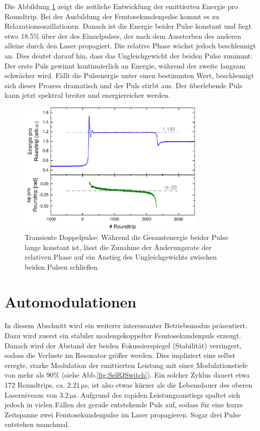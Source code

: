 \documentclass[bachelor,       %
               twoside,        %
               BCOR10mm,       %
               liststotoc,nomtotoc,bibtotoc, %
               english,ngerman, %
               final,          %
               ]{GAUBM}
\begin{document}
Die Abbildung \ref{fig:TransientSplittingAusw} zeigt die zeitliche Entwicklung der emittierten Energie pro Roundtrip.
Bei der Ausbildung der Femtosekundenpulse kommt es zu Relaxationsoszillationen.
Danach ist die Energie beider Pulse konstant und liegt etwa 18.5\% über der des Einzelpulses, der nach dem Aussterben des anderen alleine durch den Laser propagiert.
Die relative Phase wächst jedoch beschleunigt an.
Dies deutet darauf hin, dass das Ungleichgewicht der beiden Pulse zunimmt: Der erste Puls gewinnt kontinuierlich an Energie, während der zweite langsam schwächer wird.
Fällt die Pulsenergie unter einen bestimmten Wert, beschleunigt sich dieser Prozess dramatisch und der Puls stirbt aus.
Der überlebende Puls kann jetzt spektral breiter und energiereicher werden.
\begin{figure}[!htb]
	\centering
	\includegraphics[width=0.8\textwidth]{figures/TransientSplittingAusw}
	\caption{Transiente Doppelpulse: Während die Gesamtenergie beider Pulse lange konstant ist, lässt die Zunahme der Änderungsrate der relativen Phase auf ein Anstieg des Ungleichgewichts zwischen beiden Pulsen schließen.}
	\label{fig:TransientSplittingAusw}
\end{figure}

\clearpage
\section{Automodulationen}
\label{sec:automod}
In diesem Abschnitt wird ein weiterer interessanter Betriebsmodus präsentiert.
Dazu wird zuerst ein stabiler modengekoppelter Femtosekundenpuls erzeugt.
Danach wird der Abstand der beiden Fokussierspiegel (Stabilität) verringert, sodass die Verluste im Resonator größer werden.
Dies impliziert eine selbst erregte, starke Modulation der emittierten Leistung mit einer Modulationstiefe von mehr als 90\% (siehe Abb.\ref{fig:SelfQSwitch}).
Ein solcher Zyklus dauert etwa 172 Roundtrips, ca. $2.21\,\si{\micro\second}$, ist also etwas kürzer als die Lebensdauer des oberen Laserniveaus von $3.2\,\si{\micro\second}$.
Aufgrund des rapiden Leistungsanstiegs spaltet sich jedoch in vielen Fällen der gerade entstehende Puls auf, sodass für eine kurze Zeitspanne zwei Femtosekundenpulse im Laser propagieren.
Sogar drei Pulse entstehen manchmal.
\end{document}
